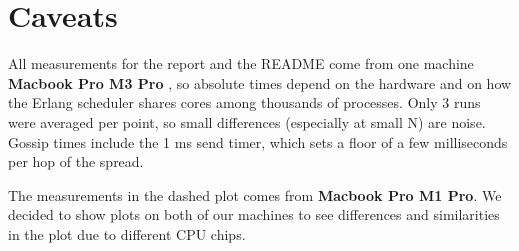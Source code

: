 \documentclass[conference]{styles/acmsiggraph}
\begin{document}
\section{Caveats}
All measurements for the report and the README come from one machine \textbf{Macbook Pro M3 Pro} , so absolute times depend on the hardware and on how the
Erlang scheduler shares cores among thousands of processes. Only 3 runs were averaged per point, so
small differences (especially at small N) are noise. Gossip times include the 1 ms send timer, which sets a
floor of a few milliseconds per hop of the spread.

The measurements in the dashed plot comes from \textbf{Macbook Pro M1 Pro}. We decided to show plots on both of our machines to see differences and similarities in the plot due to different CPU chips.
\end{document}

